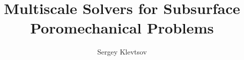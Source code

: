 \documentclass{report}
\title{Multiscale Solvers for Subsurface Poromechanical Problems}
\author{Sergey Klevtsov}
\begin{document}
 
\beforepreface





\afterpreface











\appendix


\end{document}
